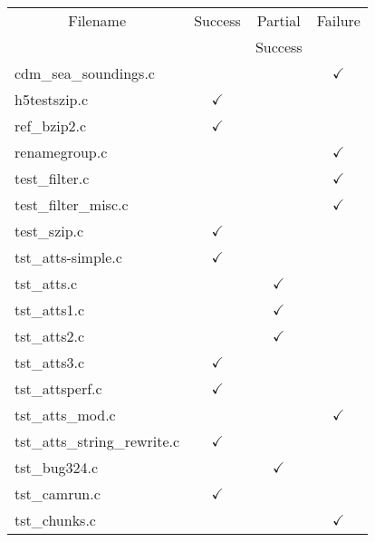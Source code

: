 \begin{table}[H]
\centering
\begin{tabular}{|l|c|c|c|}
\hline
\multicolumn{1}{|c|}{\parbox{8cm}{\centering Filename}} & \multicolumn{1}{c|}{Success} & \multicolumn{1}{c|}{Partial} & \multicolumn{1}{c|}{Failure} \\
& &                 Success  &                              \\ \hline \hline
cdm\_sea\_soundings.c   &               &               & $\checkmark$  \\ \hline
h5testszip.c            & $\checkmark$  &               &               \\ \hline
ref\_bzip2.c            & $\checkmark$  &               &               \\ \hline
renamegroup.c           &               &               & $\checkmark$  \\ \hline
test\_filter.c          &               &               & $\checkmark$  \\ \hline
test\_filter\_misc.c    &               &               & $\checkmark$  \\ \hline
test\_szip.c            & $\checkmark$  &               &               \\ \hline
tst\_atts-simple.c      & $\checkmark$  &               &               \\ \hline
tst\_atts.c             &               & $\checkmark$  &               \\ \hline
tst\_atts1.c            &               & $\checkmark$  &               \\ \hline
tst\_atts2.c            &               & $\checkmark$  &               \\ \hline
tst\_atts3.c            & $\checkmark$  &               &               \\ \hline
tst\_attsperf.c         & $\checkmark$  &               &               \\ \hline
tst\_atts\_mod.c        &               &               & $\checkmark$  \\ \hline
tst\_atts\_string\_rewrite.c & $\checkmark$ &           &               \\ \hline
tst\_bug324.c           &               & $\checkmark$  &               \\ \hline
tst\_camrun.c           & $\checkmark$  &               &               \\ \hline
tst\_chunks.c           &               &               & $\checkmark$  \\ \hline

\end{tabular}
\end{table}
